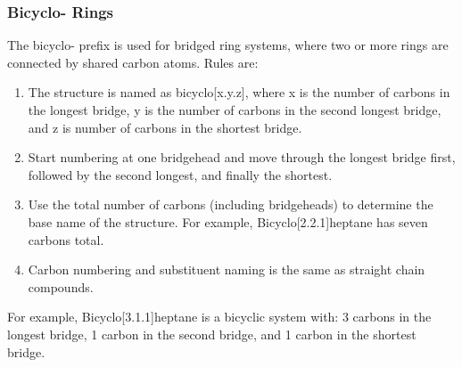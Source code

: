 \documentclass[a4paper,12pt]{report}
\begin{document}
\subsubsection{Bicyclo- Rings}
The bicyclo- prefix is used for bridged ring systems, where two or more rings are connected by shared carbon atoms. Rules are:
\begin{enumerate}
\item The structure is named as bicyclo[x.y.z], where x is the number of carbons in the longest bridge, y is the number of carbons in the second longest bridge, and z is number of carbons in the shortest bridge.
\item Start numbering at one bridgehead and move through the longest bridge first, followed by the second longest, and finally the shortest.
\item Use the total number of carbons (including bridgeheads) to determine the base name of the structure. For example, Bicyclo[2.2.1]heptane has seven carbons total.
\item Carbon numbering and substituent naming is the same as straight chain compounds.
\end{enumerate}
For example, Bicyclo[3.1.1]heptane is a bicyclic system with: 3 carbons in the longest bridge, 1 carbon in the second bridge, and 1 carbon in the shortest bridge.
\end{document}
